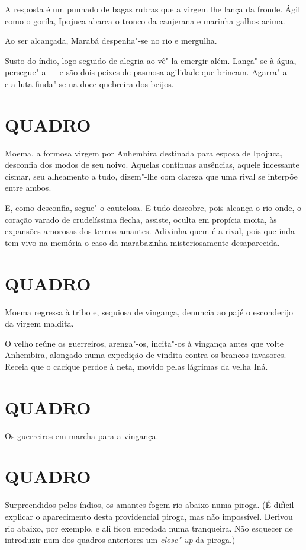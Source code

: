 A resposta é um punhado de bagas rubras que a virgem lhe lança da
fronde. Ágil como o gorila, Ipojuca abarca o tronco da canjerana e
marinha galhos acima.

Ao ser alcançada, Marabá despenha"-se no rio e mergulha.

Susto do índio, logo seguido de alegria ao vê"-la emergir além. Lança"-se
à água, persegue"-a --- e são dois peixes de pasmosa agilidade que
brincam. Agarra"-a --- e a luta finda"-se na doce quebreira dos beijos.

\section*{QUADRO}

Moema, a formosa virgem por Anhembira destinada para esposa de Ipojuca,
desconfia dos modos de seu noivo. Aquelas contínuas ausências, aquele
incessante cismar, seu alheamento a tudo, dizem"-lhe com clareza que uma
rival se interpõe entre ambos.

E, como desconfia, segue"-o cautelosa. E tudo descobre, pois alcança o
rio onde, o coração varado de crudelíssima flecha, assiste, oculta em
propícia moita, às expansões amorosas dos ternos amantes. Adivinha quem
é a rival, pois que inda tem vivo na memória o caso da marabazinha
misteriosamente desaparecida.

\section*{QUADRO}

Moema regressa à tribo e, sequiosa de vingança, denuncia ao pajé o
esconderijo da virgem maldita.

O velho reúne os guerreiros, arenga"-os, incita"-os à vingança antes que
volte Anhembira, alongado numa expedição de vindita contra os brancos
invasores. Receia que o cacique perdoe à neta, movido pelas lágrimas da
velha Iná.

\section*{QUADRO}

Os guerreiros em marcha para a vingança.

\section*{QUADRO}

Surpreendidos pelos índios, os amantes fogem rio abaixo numa piroga. (É
difícil explicar o aparecimento desta providencial piroga, mas não
impossível. Derivou rio abaixo, por exemplo, e ali ficou enredada numa
tranqueira. Não esquecer de introduzir num dos quadros anteriores um
\emph{close"-up} da piroga.)

